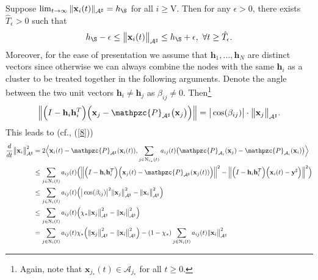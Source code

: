 \documentclass[a4paper, 11pt]{article}
\begin{document}
Suppose $\lim_{t\to\infty}\|\mathbf{x}_i(t)\|_{\mathcal{A}^\sharp}=h_\S$ for all $i\geq \mathrm{V}$. Then for any $\epsilon>0$, there exists $\hat{T}_{\epsilon}>0$ such that
\begin{align}\label{rr10}
h_\S-\epsilon\leq \big\|\mathbf{x}_i(t)\big\|_{\mathcal{A}^\sharp}\leq h_\S+\epsilon,\ \forall t\geq  \hat{T}_{\epsilon}.
\end{align}
Moreover, for the ease of presentation  we assume that $\mathbf{h}_1,\dots,\mathbf{h}_N$ are distinct vectors since otherwise we can always combine the nodes with the same $\mathbf{h}_i$ as a cluster to be treated together in the following arguments.
Denote the angle between the two unit vectors $\mathbf{h}_{i}\neq \mathbf{h}_{j}$ as $\beta_{ij}\neq 0$. Then\footnote{Again, note that $\mathbf{x}_{j_\ast}(t)\in \mathcal{A}_{j_\ast}$ for all $t\geq 0$.}
\begin{align}
\Big\|\Big(I-\mathbf{h}_{i}\mathbf{h}_{i}^T\Big)\Big(\mathbf{x}_{j}-\mathpzc{P}_{\mathcal{A}^\sharp} \big(\mathbf{x}_{j} \big)\Big)\Big\|=\big|\cos (\beta_{ij})\big|\cdot \big \|\mathbf{x}_{j}\big\|_{\mathcal{A}^\sharp}.
\end{align}
This leads to (cf., (\ref{8}))
\begin{align}\label{19}
\frac{d}{dt} \big \|\mathbf{x}_{i}\big\|_{\mathcal{A}^\sharp}^2
&= 2\Big\langle \mathbf{x}_{i}(t)-\mathpzc{P}_{\mathcal{A}^\sharp}( \mathbf{x}_i(t)), \sum_{j\in \mathrm{N}_{i_\ast}(t)}a_{ij}(t)\big(\mathpzc{P}_{\mathcal{A}_i}(\mathbf{x}_j)-\mathpzc{P}_{\mathcal{A}_i}(\mathbf{x}_i)\big)\Big\rangle\nonumber\\
&\leq  \sum_{j\in \mathrm{N}_i(t)}{a_{ij}(t)} \Big(\Big\|\Big(I-\mathbf{h}_i\mathbf{h}_i^T\Big)\Big(\mathbf{x}_j(t)- \mathpzc{P}_{\mathcal{A}^\sharp}(\mathbf{x}_j(t))\Big)\Big\|^2 - \Big\|\Big(I-\mathbf{h}_i\mathbf{h}_i^T\Big)\Big(\mathbf{x}_i(t)-\mathbf{y}^\sharp\Big)\Big\|^2  \Big) \nonumber\\
&\leq\sum_{j\in \mathrm{N}_i(t)}{a_{ij}(t)} \Big(\big|\cos (\beta_{ij})\big|^2  \|\mathbf{x}_{j}\big\|_{\mathcal{A}^\sharp}^2 - \|\mathbf{x}_{i}\big\|_{\mathcal{A}^\sharp}^2 \Big) \nonumber\\
&\leq   \sum_{j\in \mathrm{N}_i(t)}{a_{ij}(t)}  \Big(\chi_\ast \|\mathbf{x}_{j}\big\|_{\mathcal{A}^\sharp}^2 - \|\mathbf{x}_{i}\big\|_{\mathcal{A}^\sharp}^2 \Big)\nonumber\\
&=  \sum_{j\in \mathrm{N}_i(t)}{a_{ij}(t)} \chi_\ast  \Big(\|\mathbf{x}_{j}\big\|_{\mathcal{A}^\sharp}^2 - \|\mathbf{x}_{i}\big\|_{\mathcal{A}^\sharp}^2 \Big) -(1-\chi_\ast)  \sum_{j\in \mathrm{N}_i(t)}{a_{ij}(t)} \|\mathbf{x}_{i}\big\|_{\mathcal{A}^\sharp}^2
\end{align}
\end{document}
